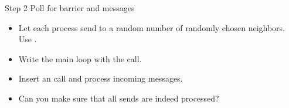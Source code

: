 \begin{numberedframe}{Step 2}
  Poll for barrier and messages
\end{numberedframe}

\begin{exerciseframe}[ibarrierupdate]
  \begin{itemize}
  \item Let each process send to a random number of randomly chosen
    neighbors. Use .
  \item Write the main loop with the  call.
  \item Insert an  call and process incoming messages.
  \item Can you make sure that all sends are indeed processed?
  \end{itemize}
\end{exerciseframe}

\endinput

\begin{numberedframe}{}
\begin{lstlisting}
  
\end{lstlisting}
\end{numberedframe}

